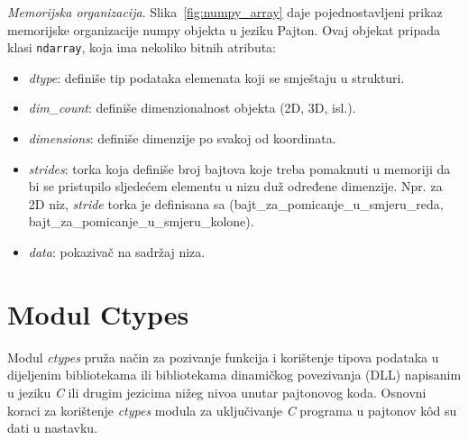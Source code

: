  \textit{Memorijska organizacija}. Slika~\ref{fig:numpy_array} daje pojednostavljeni prikaz memorijske organizacije numpy objekta u jeziku Pajton.  Ovaj objekat pripada klasi \texttt{ndarray}, koja ima nekoliko bitnih atributa: 
 \begin{itemize}
 	\item \textit{dtype}: definiše tip podataka elemenata koji se smještaju u strukturi.
 	\item \textit{dim\_count}: definiše dimenzionalnost objekta (2D, 3D, isl.).  
 	\item \textit{dimensions}: definiše dimenzije po svakoj od koordinata.  
 	\item \textit{strides}: torka koja definiše broj bajtova koje treba pomaknuti u memoriji da bi se pristupilo sljedećem elementu u nizu duž određene dimenzije. Npr. za 2D niz, \textit{stride} torka je definisana sa (bajt\_za\_pomicanje\_u\_smjeru\_reda, bajt\_za\_pomicanje\_u\_smjeru\_kolone). 
 	\item \textit{data}: pokazivač na sadržaj niza. 
 \end{itemize} 
 

\section{Modul Ctypes}

Modul \textit{ctypes} pruža način za pozivanje funkcija i korištenje tipova podataka u dijeljenim  bibliotekama ili bibliotekama dinamičkog povezivanja (DLL) napisanim u jeziku \textit{C} ili drugim jezicima nižeg nivoa unutar pajtonovog koda. Osnovni  koraci za korištenje \textit{ctypes} modula za uključivanje \textit{C} programa u pajtonov k\^od su dati u nastavku.

